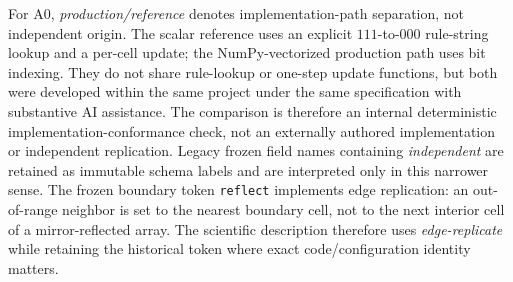 For A0, \emph{production/reference} denotes implementation-path separation, not independent
origin. The scalar reference uses an explicit \(111\)-to-\(000\) rule-string lookup and a per-cell
update; the NumPy-vectorized production path uses bit indexing. They do not share rule-lookup or
one-step update functions, but both were developed within the same project under the same
specification with substantive AI assistance. The comparison is therefore an internal
deterministic implementation-conformance check, not an externally authored implementation or
independent replication. Legacy frozen field names containing \emph{independent} are retained as
immutable schema labels and are interpreted only in this narrower sense.
The frozen boundary token \texttt{reflect} implements edge replication: an out-of-range neighbor is
set to the nearest boundary cell, not to the next interior cell of a mirror-reflected array. The
scientific description therefore uses \emph{edge-replicate} while retaining the historical token
where exact code/configuration identity matters.

